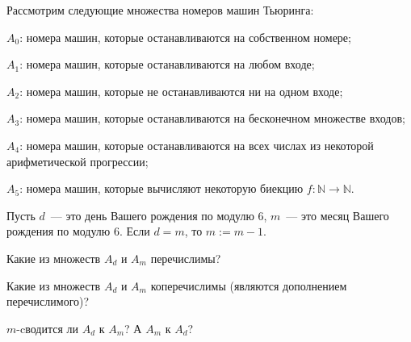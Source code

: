 \z Рассмотрим следующие множества номеров машин Тьюринга:
\begin{itemtask}
    \item $A_0$: номера машин, которые останавливаются на собственном номере;
    \item $A_1$: номера машин, которые останавливаются на любом входе;
    \item $A_2$: номера машин, которые не останавливаются ни на одном входе;
    \item $A_3$: номера машин, которые останавливаются на бесконечном множестве входов;
    \item $A_4$: номера машин, которые останавливаются на всех числах из некоторой арифметической
        прогрессии;
    \item $A_5$: номера машин, которые вычисляют некоторую биекцию $f:\mathbb{N} \to \mathbb{N}$.
\end{itemtask}
Пусть $d$~--- это день Вашего рождения по модулю $6$, $m$~--- это месяц Вашего рождения по модулю
$6$. Если $d = m$, то $m := m - 1$.
\begin{enumcyr}
    \item Какие из множеств $A_d$ и $A_m$ перечислимы?
    \item Какие из множеств $A_d$ и $A_m$ коперечислимы (являются дополнением перечислимого)?
    \item $m$-cводится ли $A_d$ к $A_m$? А $A_m$ к $A_d$?
\end{enumcyr}